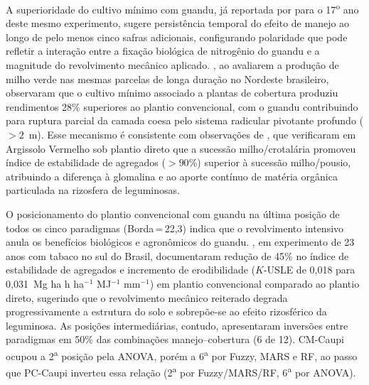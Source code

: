 \documentclass[pdflatex,sn-basic]{sn-jnl}%
\begin{document}
A superioridade do cultivo mínimo com guandu, já reportada por \cite{Assuncao2023} para o 17\textsuperscript{o} ano deste mesmo experimento, sugere persistência temporal do efeito de manejo ao longo de pelo menos cinco safras adicionais, configurando polaridade que pode refletir a interação entre a fixação biológica de nitrogênio do guandu e a magnitude do revolvimento mecânico aplicado. \cite{SantosJA2024}, ao avaliarem a produção de milho verde nas mesmas parcelas de longa duração no Nordeste brasileiro, observaram que o cultivo mínimo associado a plantas de cobertura produziu rendimentos 28\% superiores ao plantio convencional, com o guandu contribuindo para ruptura parcial da camada coesa pelo sistema radicular pivotante profundo ($> 2$~m). Esse mecanismo é consistente com observações de \cite{daSilva2021}, que verificaram em Argissolo Vermelho sob plantio direto que a sucessão milho/crotalária promoveu índice de estabilidade de agregados ($> 90$\%) superior à sucessão milho/pousio, atribuindo a diferença à glomalina e ao aporte contínuo de matéria orgânica particulada na rizosfera de leguminosas.

O posicionamento do plantio convencional com guandu na última posição de todos os cinco paradigmas (Borda\,=\,22,3) indica que o revolvimento intensivo anula os benefícios biológicos e agronômicos do guandu. \cite{Thomaz2022}, em experimento de 23 anos com tabaco no sul do Brasil, documentaram redução de 45\% no índice de estabilidade de agregados e incremento de erodibilidade ($K$-USLE de 0,018 para 0,031~Mg ha h ha$^{-1}$ MJ$^{-1}$ mm$^{-1}$) em plantio convencional comparado ao plantio direto, sugerindo que o revolvimento mecânico reiterado degrada progressivamente a estrutura do solo e sobrepõe-se ao efeito rizosférico da leguminosa. As posições intermediárias, contudo, apresentaram inversões entre paradigmas em 50\% das combinações manejo--cobertura (6 de 12). CM-Caupi ocupou a 2\textsuperscript{a} posição pela ANOVA, porém a 6\textsuperscript{a} por Fuzzy, MARS e RF, ao passo que PC-Caupi inverteu essa relação (2\textsuperscript{a} por Fuzzy/MARS/RF, 6\textsuperscript{a} por ANOVA). 
\end{document}

